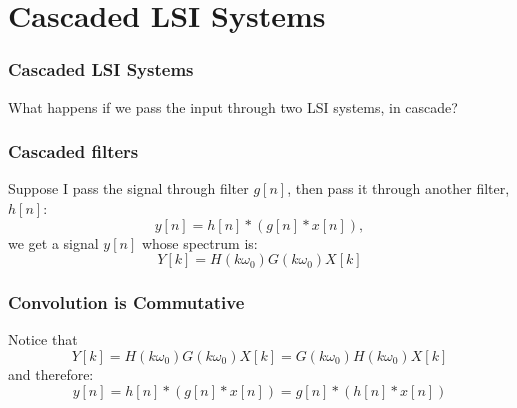 \documentclass{beamer}
\begin{document}
\section[Cascades]{Cascaded LSI Systems}
\setcounter{subsection}{1}

\begin{frame}
  \frametitle{Cascaded LSI Systems}

  What happens if we pass the input through two LSI systems, in cascade?
  \begin{center}
  \end{center}
\end{frame}
  
\begin{frame}
  \frametitle{Cascaded filters}

  Suppose I pass the signal through filter $g[n]$, then pass it through
  another filter, $h[n]$:
  \[
  y[n]=h[n]\ast \left(g[n]\ast x[n]\right),
  \]
  we get a signal $y[n]$ whose spectrum is:
  \[
  Y[k]=H(k\omega_0) G(k\omega_0) X[k]
  \]
\end{frame}


\begin{frame}
  \frametitle{Convolution  is Commutative}

  Notice that
  \[
  Y[k] = H(k\omega_0) G(k\omega_0) X[k]=G(k\omega_0)H(k\omega_0) X[k]
  \]
  and therefore:
  \[
  y[n]=h[n]\ast \left(g[n]\ast x[n]\right)=g[n]\ast \left(h[n]\ast x[n]\right)
  \]
\end{frame}
\end{document}
